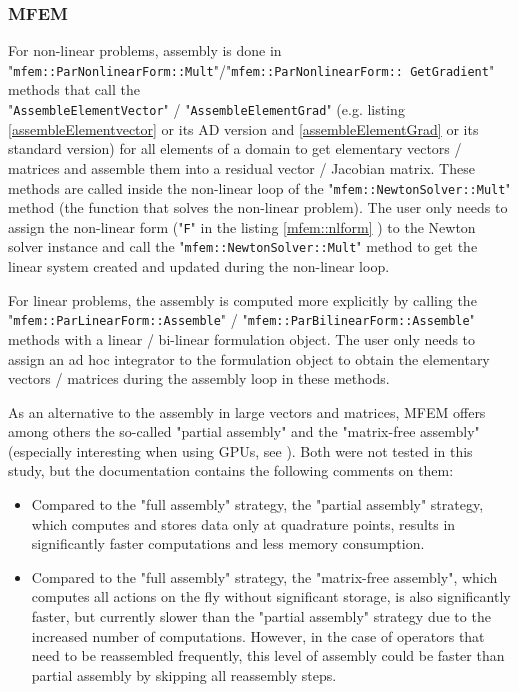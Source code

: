 \documentclass[12pt]{article}
\newcommand{\mycode}[1]{\textsf{"}\lstinline`#1`\textsf{"}}
\begin{document}
\subsubsection{MFEM\label{assemblyMFEM}}
For non-linear problems, assembly is done in \mycode{mfem::ParNonlinearForm::Mult}/\mycode{mfem::ParNonlinearForm:: GetGradient} methods that call the\\ \mycode{AssembleElementVector} / \mycode{AssembleElementGrad}  (e.g. listing \ref{assembleElementvector} or its AD version and \ref{assembleElementGrad} or its standard version) for all elements of a domain to get elementary vectors / matrices and assemble them into a residual vector / Jacobian matrix.
These methods are called inside the non-linear loop of the \mycode{mfem::NewtonSolver::Mult} method (the function that solves the non-linear problem). 
The user only needs to assign the non-linear form (\mycode{F} in the listing \ref{mfem::nlform} ) to the Newton solver instance and call the \mycode{mfem::NewtonSolver::Mult} method to get the linear system created and updated during the non-linear loop.

For linear problems, the assembly is computed more explicitly  by calling the \mycode{mfem::ParLinearForm::Assemble} / \mycode{mfem::ParBilinearForm::Assemble} methods with a linear / bi-linear formulation object.
The user only needs to assign an ad hoc integrator to the formulation object to obtain the elementary vectors / matrices during the assembly loop in these methods.

As an alternative to the assembly in large vectors and matrices, MFEM offers among others the so-called "partial assembly" and the "matrix-free assembly" (especially interesting when using GPUs, see \cite{andrej2024highperformancefiniteelementsmfem}). Both were not tested in this study, but the documentation contains the following comments on them:
\begin{itemize}
	\item Compared to the "full assembly" strategy, the "partial assembly" strategy, which computes and stores data only at quadrature points, results in significantly faster computations  and less memory consumption.  
	\item Compared to the "full assembly" strategy, the "matrix-free assembly", which computes all actions on the fly without significant storage, is also significantly faster, but currently slower than the "partial assembly" strategy due to the increased number of computations. However, in the case of operators that need to be reassembled frequently, this level of assembly could be faster than partial assembly by skipping all reassembly steps.
\end{itemize}
\end{document}
